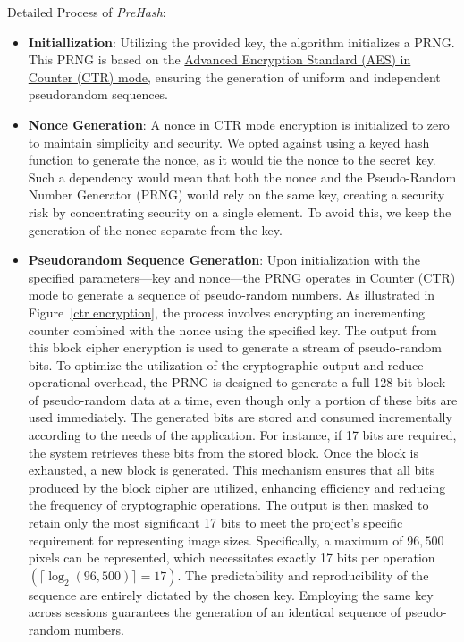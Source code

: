 Detailed Process of \textit{PreHash}:
\begin{itemize}
    \item \textbf{Initiallization}: Utilizing the provided key, the algorithm initializes a PRNG. This PRNG is based on the \hyperref[def:AES CTR mode]{Advanced Encryption Standard (AES) in Counter (CTR) mode}, ensuring the generation of uniform and independent pseudorandom sequences.

    \item \textbf{Nonce Generation}: A nonce in CTR mode encryption is initialized to zero to maintain simplicity and security. We opted against using a keyed hash function to generate the nonce, as it would tie the nonce to the secret key. Such a dependency would mean that both the nonce and the Pseudo-Random Number Generator (PRNG) would rely on the same key, creating a security risk by concentrating security on a single element. To avoid this, we keep the generation of the nonce separate from the key.

    \item \textbf{Pseudorandom Sequence Generation}: Upon initialization with the specified parameters—key and nonce—the PRNG operates in Counter (CTR) mode to generate a sequence of pseudo-random numbers. As illustrated in Figure~\ref{ctr encryption}, the process involves encrypting an incrementing counter combined with the nonce using the specified key. The output from this block cipher encryption is used to generate a stream of pseudo-random bits.
    To optimize the utilization of the cryptographic output and reduce operational overhead, the PRNG is designed to generate a full 128-bit block of pseudo-random data at a time, even though only a portion of these bits are used immediately. The generated bits are stored and consumed incrementally according to the needs of the application. For instance, if 17 bits are required, the system retrieves these bits from the stored block. Once the block is exhausted, a new block is generated.
    This mechanism ensures that all bits produced by the block cipher are utilized, enhancing efficiency and reducing the frequency of cryptographic operations. The output is then masked to retain only the most significant 17 bits to meet the project's specific requirement for representing image sizes. Specifically, a maximum of \(96,500\) pixels can be represented, which necessitates exactly 17 bits per operation \(\left(\lceil \log_2(96,500) \rceil = 17\right)\).
    The predictability and reproducibility of the sequence are entirely dictated by the chosen key. Employing the same key across sessions guarantees the generation of an identical sequence of pseudo-random numbers.
    


\end{itemize}
